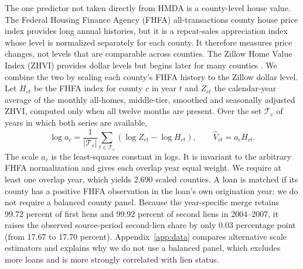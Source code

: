 \documentclass[letterpaper,12pt,usenames,dvipsnames]{article}
\newcommand{\pbrac}[1]{\left( #1 \right)}
\theoremstyle{definition}
\begin{document}
The one predictor not taken directly from HMDA is a county-level house value. The Federal
Housing Finance Agency (FHFA) all-transactions county house price index
\citep{bogin2019local,fhfa2026county} provides long annual histories, but it is a repeat-sales
appreciation index whose level is normalized separately for each county. It therefore measures
price changes, not levels that are comparable across counties. The Zillow Home Value Index
(ZHVI) provides dollar levels but begins later for many counties \citep{zillow2026zhvi}. We
combine the two by scaling each county's FHFA history to the Zillow dollar level. Let $H_{ct}$
be the FHFA index for county $c$ in year $t$ and $Z_{ct}$ the calendar-year average of the
monthly all-homes, middle-tier, smoothed and seasonally adjusted ZHVI, computed only when all
twelve months are present. Over the set $\mathcal{T}_c$ of years in which both series are
available,
\begin{equation}
	\log a_c = \frac{1}{|\mathcal{T}_c|} \sum_{t \in \mathcal{T}_c}
	\pbrac{\log Z_{ct} - \log H_{ct}},
	\qquad
	\widehat{V}_{ct} = a_c H_{ct}.
	\label{eq:county_value}
\end{equation}
The scale $a_c$ is the least-squares constant in logs. It is invariant to the arbitrary FHFA
normalization and gives each overlap year equal weight. We require at least one overlap year,
which yields 2,690 scaled counties. A loan is matched if its county has a positive FHFA
observation in the loan's own origination year; we do not require a balanced county panel.
Because the year-specific merge retains 99.72 percent of first liens and 99.92 percent of
second liens in 2004--2007, it raises the observed source-period second-lien share by only
0.03 percentage point (from 17.67 to 17.70 percent). Appendix~\ref{app:data} compares
alternative scale estimators and explains why we do not use a balanced panel, which excludes
more loans and is more strongly correlated with lien status.
\end{document}
